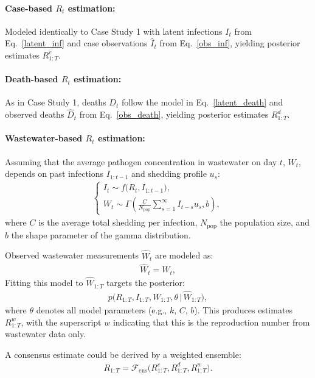 \documentclass{article}
\begin{document}
\paragraph{Case-based $R_t$ estimation:}  
Modeled identically to Case Study 1 with latent infections $I_t$ from Eq.~\eqref{latent_inf} and case observations $\widehat{I}_t$ from  Eq.~\eqref{obs_inf}, yielding posterior estimates $R_{1:T}^c$.

\paragraph{Death-based $R_t$ estimation:}  
As in Case Study 1, deaths $D_t$ follow the model in Eq.~\eqref{latent_death} and observed deaths $\widehat{D}_t$ from  Eq.~\eqref{obs_death}, yielding posterior estimates $R_{1:T}^d$.

\paragraph{Wastewater-based $R_t$ estimation:}  
Assuming that the average pathogen concentration in wastewater on day $t$, $W_t$, depends on past infections $I_{1:t-1}$ and shedding profile $u_s$:
\begin{align}
\begin{cases}
I_t \sim f\big(R_t, I_{1:t-1}\big),\\[4pt]
W_t \sim \Gamma\left(\frac{C}{N_{\mathrm{pop}}} \sum_{s=1}^\infty I_{t-s} u_s, b \right),
\end{cases}
\end{align}
where $C$ is the average total shedding per infection, $N_{\mathrm{pop}}$ the population size, and $b$ the shape parameter of the gamma distribution.

Observed wastewater measurements $\widehat{W}_t$ are modeled as:
\begin{align}
\widehat{W}_t = W_t,
\end{align}
Fitting this model to $\widehat{W}_{1:T}$ targets the posterior:
\begin{align}
p\big(R_{1:T}, I_{1:T}, W_{1:T}, \theta \,\big|\, \widehat{W}_{1:T}\big),
\end{align}
where $\theta$ denotes all model parameters (e.g., $k$, $C$, $b$).  This produces estimates $R_{1:T}^w$, with the superscript $w$ indicating that this is the reproduction number from wastewater data only. 

A consensus estimate could be derived by a weighted ensemble:
\begin{align}
R_{1:T} = \mathcal{F}_{\mathrm{ens}}\big(R_{1:T}^c, R_{1:T}^d, R_{1:T}^w \big).
\end{align}
\end{document}
